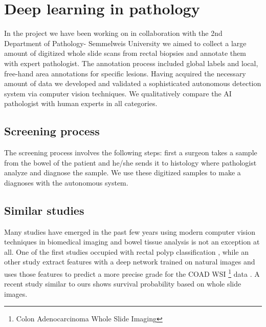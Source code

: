 \documentclass[a4paper,12pt]{article}
\begin{document}
\newpage

\section{Deep learning in pathology}

\vspace{7mm}

\par In the project we have been working on in collaboration with the 2nd Department of Pathology- Semmelweis University we aimed to collect a large amount of digitized whole slide scans from rectal biopsies and annotate them with expert pathologist. The annotation process included global labels and local, free-hand area annotations for specific lesions. Having acquired the necessary amount of data we developed and validated a sophisticated autonomous detection system via computer vision techniques. We qualitatively compare the AI pathologist with human experts in all categories.

\vspace{4mm}

\subsection{Screening process}

\vspace{4mm}

\par The screening process involves the following steps: first a surgeon takes a sample from the bowel of the patient and he/she sends it to histology where pathologist analyze and diagnose the sample. We use these digitized samples to make a diagnoses with the autonomous system.

\vspace{4mm}

\subsection{Similar studies}

\vspace{4mm}

\par Many studies have emerged in the past few years using modern computer vision techniques in biomedical imaging and bowel tissue analysis is not an exception at all. One of the first studies occupied with rectal polyp classification \cite{korbar2017deep}, while an other study extract features with a deep network trained on natural images and uses those features to predict a more precise grade for the COAD WSI \footnote{Colon Adenocarcinoma Whole Slide Imaging} data \cite{bychkov2018deep}. A recent study similar to ours shows \cite{skrede2020deep} survival probability based on whole slide images.
\end{document}
